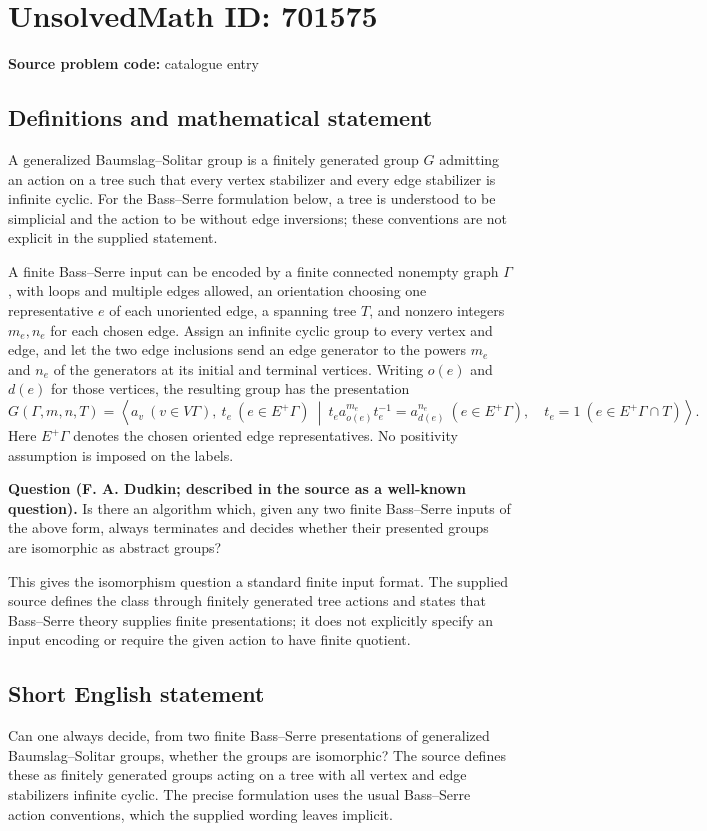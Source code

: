 \documentclass[11pt]{article}
\begin{document}
\section*{UnsolvedMath ID: 701575}
\textbf{Source problem code:} catalogue entry
\subsection{Definitions and mathematical statement}
A generalized Baumslag--Solitar group is a finitely generated group \(G\) admitting an action on a tree such that every vertex stabilizer and every edge stabilizer is infinite cyclic. For the Bass--Serre formulation below, a tree is understood to be simplicial and the action to be without edge inversions; these conventions are not explicit in the supplied statement.

A finite Bass--Serre input can be encoded by a finite connected nonempty graph \(\Gamma\), with loops and multiple edges allowed, an orientation choosing one representative \(e\) of each unoriented edge, a spanning tree \(T\), and nonzero integers \(m_e,n_e\) for each chosen edge. Assign an infinite cyclic group to every vertex and edge, and let the two edge inclusions send an edge generator to the powers \(m_e\) and \(n_e\) of the generators at its initial and terminal vertices. Writing \(o(e)\) and \(d(e)\) for those vertices, the resulting group has the presentation
\[
G(\Gamma,m,n,T)=\left\langle a_v\ (v\in V\Gamma),\ t_e\ (e\in E^+\Gamma)\ \middle|\ t_e a_{o(e)}^{m_e}t_e^{-1}=a_{d(e)}^{n_e}\ (e\in E^+\Gamma),\quad t_e=1\ (e\in E^+\Gamma\cap T)\right\rangle.
\]
Here \(E^+\Gamma\) denotes the chosen oriented edge representatives. No positivity assumption is imposed on the labels.

\textbf{Question (F. A. Dudkin; described in the source as a well-known question).} Is there an algorithm which, given any two finite Bass--Serre inputs of the above form, always terminates and decides whether their presented groups are isomorphic as abstract groups?

This gives the isomorphism question a standard finite input format. The supplied source defines the class through finitely generated tree actions and states that Bass--Serre theory supplies finite presentations; it does not explicitly specify an input encoding or require the given action to have finite quotient.
\subsection{Short English statement}
Can one always decide, from two finite Bass--Serre presentations of generalized Baumslag--Solitar groups, whether the groups are isomorphic? The source defines these as finitely generated groups acting on a tree with all vertex and edge stabilizers infinite cyclic. The precise formulation uses the usual Bass--Serre action conventions, which the supplied wording leaves implicit.
\end{document}
